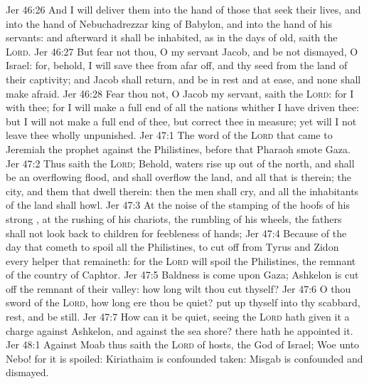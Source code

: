 \vs Jer 46:26 And I will deliver them into the hand of those that seek their lives, and into the hand of Nebuchadrezzar king of Babylon, and into the hand of his servants: and afterward it shall be inhabited, as in the days of old, saith the \textsc{Lord}.
\vs Jer 46:27 But fear not thou, O my servant Jacob, and be not dismayed, O Israel: for, behold, I will save thee from afar off, and thy seed from the land of their captivity; and Jacob shall return, and be in rest and at ease, and none shall make  afraid.
\vs Jer 46:28 Fear thou not, O Jacob my servant, saith the \textsc{Lord}: for I  with thee; for I will make a full end of all the nations whither I have driven thee: but I will not make a full end of thee, but correct thee in measure; yet will I not leave thee wholly unpunished.
\vs Jer 47:1 The word of the \textsc{Lord} that came to Jeremiah the prophet against the Philistines, before that Pharaoh smote Gaza.
\vs Jer 47:2 Thus saith the \textsc{Lord}; Behold, waters rise up out of the north, and shall be an overflowing flood, and shall overflow the land, and all that is therein; the city, and them that dwell therein: then the men shall cry, and all the inhabitants of the land shall howl.
\vs Jer 47:3 At the noise of the stamping of the hoofs of his strong , at the rushing of his chariots,  the rumbling of his wheels, the fathers shall not look back to  children for feebleness of hands;
\vs Jer 47:4 Because of the day that cometh to spoil all the Philistines,  to cut off from Tyrus and Zidon every helper that remaineth: for the \textsc{Lord} will spoil the Philistines, the remnant of the country of Caphtor.
\vs Jer 47:5 Baldness is come upon Gaza; Ashkelon is cut off  the remnant of their valley: how long wilt thou cut thyself?
\vs Jer 47:6 O thou sword of the \textsc{Lord}, how long  ere thou be quiet? put up thyself into thy scabbard, rest, and be still.
\vs Jer 47:7 How can it be quiet, seeing the \textsc{Lord} hath given it a charge against Ashkelon, and against the sea shore? there hath he appointed it.
\vs Jer 48:1 Against Moab thus saith the \textsc{Lord} of hosts, the God of Israel; Woe unto Nebo! for it is spoiled: Kiriathaim is confounded  taken: Misgab is confounded and dismayed.
